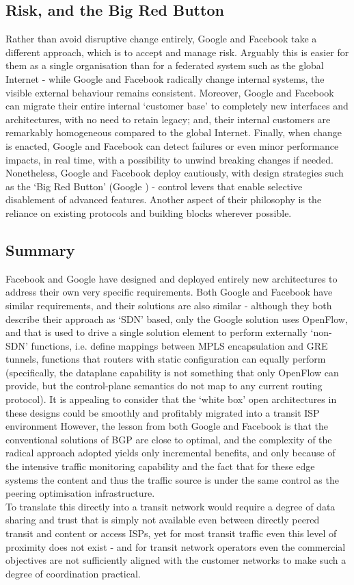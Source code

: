 \subsection{Risk, and the Big Red Button}
Rather than avoid disruptive change entirely, Google and Facebook take a different approach, which is to accept and manage risk. Arguably this is easier for them as a single organisation than for a federated system such as the global Internet - while Google and Facebook radically change internal systems, the visible external behaviour remains consistent.
Moreover, Google and Facebook can migrate their entire internal `customer base' to completely new interfaces and architectures, with no need to retain legacy; and, their internal customers are remarkably homogeneous compared to the global Internet. Finally, when change is enacted, Google and Facebook can detect failures or even minor performance impacts, in real time, with a possibility to unwind breaking changes if needed.
Nonetheless, Google and Facebook deploy cautiously, with design strategies such as the `Big Red Button' (Google \cite{Yap2017})   - control levers that enable selective disablement of advanced features.
Another aspect of their philosophy is the reliance on existing protocols and building blocks wherever possible.

\subsection{Summary}
Facebook and Google have designed and deployed entirely new architectures to address their own very specific requirements.
Both Google and Facebook have similar requirements, and their solutions are also similar - although they both describe their approach as `SDN' based, only the Google solution uses OpenFlow, and that is used to drive a single solution element to perform externally `non-SDN' functions, i.e.
define mappings between MPLS encapsulation and GRE tunnels, functions that routers with static configuration can equally perform (specifically, the dataplane capability is not something that only OpenFlow can provide, but the control-plane semantics do not map to any current routing protocol).
It is appealing to consider that the `white box' open architectures in these designs could be smoothly and profitably migrated into a transit ISP environment
However, the lesson from both Google and Facebook is that the conventional solutions of BGP are close to optimal, and the complexity of the radical approach adopted yields only incremental benefits, and only because of the intensive traffic monitoring capability and the fact that for these edge systems the content and thus the traffic source is under the same control as the peering optimisation infrastructure.
\\
To translate this directly into a transit network would require a degree of data sharing and trust that is simply not available even between directly peered transit and content or access ISPs, yet for most transit traffic even this level of proximity does not exist - and for transit network operators even the commercial objectives are not sufficiently aligned with the customer networks to make such a degree of coordination practical.

